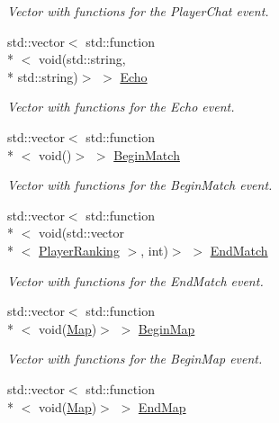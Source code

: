 \begin{DoxyCompactItemize}
\begin{DoxyCompactList}\small\item\em Vector with functions for the Player\-Chat event. \end{DoxyCompactList}\item 
\hypertarget{classPlugin_a427a43a87266e448d5543219a9fd26a2}{std\-::vector$<$ std\-::function\\*
$<$ void(std\-::string, \\*
std\-::string)$>$ $>$ \hyperlink{classPlugin_a427a43a87266e448d5543219a9fd26a2}{Echo}}\label{classPlugin_a427a43a87266e448d5543219a9fd26a2}

\begin{DoxyCompactList}\small\item\em Vector with functions for the Echo event. \end{DoxyCompactList}\item 
\hypertarget{classPlugin_a83f8709eb14504c24e44792438fea9f8}{std\-::vector$<$ std\-::function\\*
$<$ void()$>$ $>$ \hyperlink{classPlugin_a83f8709eb14504c24e44792438fea9f8}{Begin\-Match}}\label{classPlugin_a83f8709eb14504c24e44792438fea9f8}

\begin{DoxyCompactList}\small\item\em Vector with functions for the Begin\-Match event. \end{DoxyCompactList}\item 
\hypertarget{classPlugin_a772ce957615c12fd06fdf3190b5c85f5}{std\-::vector$<$ std\-::function\\*
$<$ void(std\-::vector\\*
$<$ \hyperlink{structPlayerRanking}{Player\-Ranking} $>$, int)$>$ $>$ \hyperlink{classPlugin_a772ce957615c12fd06fdf3190b5c85f5}{End\-Match}}\label{classPlugin_a772ce957615c12fd06fdf3190b5c85f5}

\begin{DoxyCompactList}\small\item\em Vector with functions for the End\-Match event. \end{DoxyCompactList}\item 
\hypertarget{classPlugin_a2ba64350d1fcc5269e2f61a0e3725e33}{std\-::vector$<$ std\-::function\\*
$<$ void(\hyperlink{structMap}{Map})$>$ $>$ \hyperlink{classPlugin_a2ba64350d1fcc5269e2f61a0e3725e33}{Begin\-Map}}\label{classPlugin_a2ba64350d1fcc5269e2f61a0e3725e33}

\begin{DoxyCompactList}\small\item\em Vector with functions for the Begin\-Map event. \end{DoxyCompactList}\item 
\hypertarget{classPlugin_ad872750ef7512a9961bc7653a5d8056c}{std\-::vector$<$ std\-::function\\*
$<$ void(\hyperlink{structMap}{Map})$>$ $>$ \hyperlink{classPlugin_ad872750ef7512a9961bc7653a5d8056c}{End\-Map}}\label{classPlugin_ad872750ef7512a9961bc7653a5d8056c}


\end{DoxyCompactItemize}
